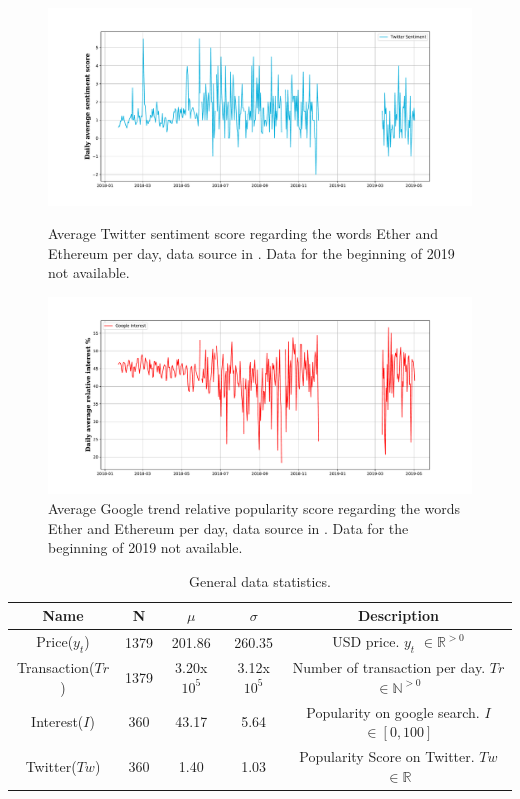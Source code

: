 \begin{figure}[!h]
	\centering
	\begin{minipage}[b]{0.85\textwidth}
		\includegraphics[width=\textwidth]{data/twitter.pdf}
		\caption{ Average Twitter sentiment score regarding the words Ether and Ethereum per day, data source in \cite{deepblueai}. Data for the beginning of 2019 not available.} 
		\label{fig:twitter_plot}
	\end{minipage}
	\hfill
	\begin{minipage}[b]{0.85\textwidth}
		\includegraphics[width=\textwidth]{data/google.pdf}
		\caption{  Average Google trend relative popularity score regarding the words Ether and Ethereum per day, data source in \cite{deepblueai}. Data for the beginning of 2019 not available.}
		\label{fig:google_plot}
	\end{minipage}
\end{figure}


\begin{table}[h!]
	\begin{center}
		\begin{tabular}{||c c c c c||} 
			\hline
			Name & N & $\mu$ & $\sigma$ & Description\\ [0.5ex] 
			\hline\hline
			Price($y_{t}$) & 1379 & 201.86 & 260.35 & USD price. $y_{t}$ $\in \mathbb{R}^{>0}$ \\ 
			\hline
			Transaction($Tr$) & 1379 & 3.20x$10^{5}$ & 3.12x$10^{5}$ & Number of transaction per day. $Tr$ $\in \mathbb{N}^{>0}$  \\ 
			\hline
			Interest($I$) & 360 & 43.17 & 5.64 & Popularity on google search. $I$ $\in [0,100]$  \\
			\hline
			Twitter($Tw$) & 360 & 1.40 & 1.03 & Popularity Score on Twitter.  $Tw$ $\in \mathbb{R}$ \\
			\hline
		\end{tabular}
		\caption{General data statistics.}
		\label{table:general_statistics}
	\end{center}
\end{table}


